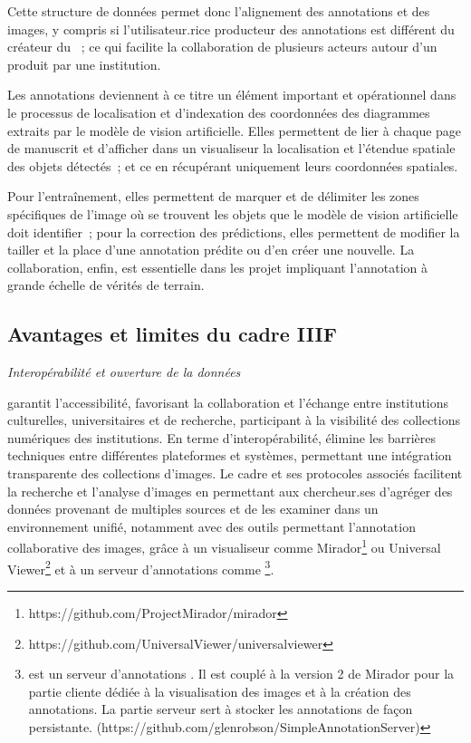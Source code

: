 Cette structure de données permet donc l'alignement des annotations et
des images, y compris si l'utilisateur.rice producteur des annotations est
différent du créateur du \man~; ce qui facilite la collaboration de plusieurs acteurs autour d'un \man produit
par une institution.

Les annotations deviennent à ce titre un élément important et
opérationnel dans le processus de localisation et d'indexation des
coordonnées des diagrammes extraits par le modèle de vision
artificielle. Elles permettent de lier à chaque page de manuscrit et
d'afficher dans un visualiseur la localisation et l'étendue spatiale des objets détectés~; et ce en
récupérant uniquement leurs coordonnées spatiales.

Pour l'entraînement, elles permettent de marquer et de délimiter les
zones spécifiques de l'image où se trouvent les objets que le modèle de
vision artificielle doit identifier~; pour la correction des
prédictions, elles permettent de modifier la tailler et la place d'une
annotation prédite ou d'en créer une nouvelle. La collaboration, enfin,
est essentielle dans les projet impliquant l'annotation à grande échelle
de vérités de terrain.

\hypertarget{avantages-et-limites-du-cadre-iiif}{%
\subsection{Avantages et limites du cadre
IIIF}\label{avantages-et-limites-du-cadre-iiif}}

\emph{Interopérabilité et ouverture de la données}

\iiif garantit l'accessibilité, favorisant la collaboration et l'échange
entre institutions culturelles, universitaires et de recherche,
participant à la visibilité des collections numériques des institutions.
En terme d'interopérabilité, \iiif élimine les barrières techniques entre
différentes plateformes et systèmes, permettant une intégration
transparente des collections d'images. Le cadre et ses protocoles
associés facilitent la recherche et l'analyse d'images en permettant aux
chercheur.ses d'agréger des données provenant de multiples sources et de
les examiner dans un environnement unifié, notamment avec des outils
permettant l'annotation collaborative des images, grâce à un visualiseur comme
Mirador\footnote{https://github.com/ProjectMirador/mirador} ou Universal
Viewer\footnote{https://github.com/UniversalViewer/universalviewer} et à un serveur d'annotations
comme \sas\footnote{\sas est un serveur d'annotations
  \iiif. Il est couplé à la version 2 de Mirador pour la partie cliente
  dédiée à la visualisation des images et à la création des annotations.
  La partie serveur sert à stocker les annotations de façon persistante.
  (https://github.com/glenrobson/SimpleAnnotationServer)}.

